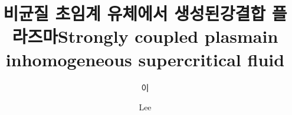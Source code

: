 \documentclass[doctor,english,final,pdfdoc]{style/postech-ucs}
\title[korean]{비균질 초임계 유체에서 생성된\linebreak 강결합 플라즈마}
\title[english]{Strongly coupled plasma\linebreak in inhomogeneous supercritical fluid}
\author[korean]{이}{승 택}
\author[english]{Lee}{Seungtaek}
\begin{document}
\begin{abstract}
    
\end{abstract}


\setcounter{tocdepth}{1} %
\tableofcontents %




\renewcommand{\thechapter}{\Alph{chapter}}
\renewcommand{\thesection}{\Alph{chapter}.\arabic{section}} %
\renewcommand{\thefigure}{\Alph{chapter}.\arabic{figure}} %
\renewcommand{\thetable}{\Alph{chapter}.\arabic{table}} %
\renewcommand{\theequation}{\Alph{chapter}.\arabic{equation}} %
\begin{appendices}
\end{appendices}


\begin{summarykorean}
    
\end{summarykorean}


\linespread{1.2}\selectfont %

\linespread{1.8}\selectfont %


\acknowledgement[korean]



\curriculumvitae[korean]



\afterpage{\blankpage}


\end{document}
